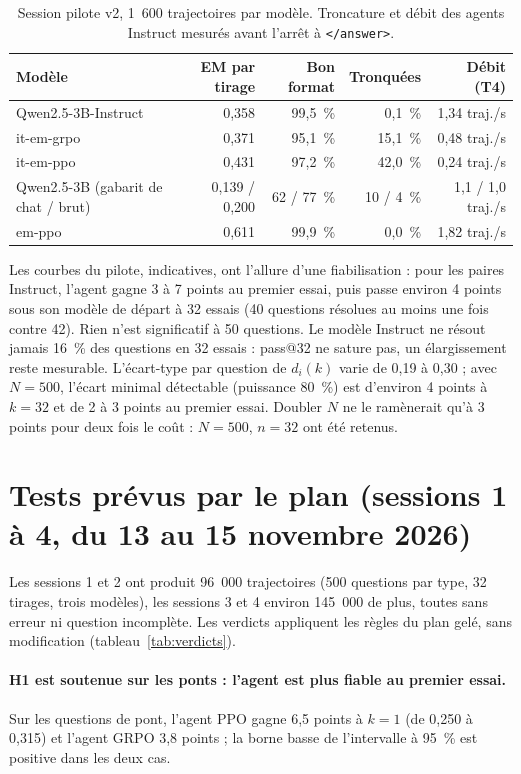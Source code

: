 \begin{table}[h]\centering\small
\begin{tabular}{lrrrr}\toprule
Modèle & EM par tirage & Bon format & Tronquées & Débit (T4)\\\midrule
Qwen2.5-3B-Instruct & 0,358 & 99,5~\% & 0,1~\% & 1,34 traj./s\\
\quad it-em-grpo & 0,371 & 95,1~\% & 15,1~\% & 0,48 traj./s\\
\quad it-em-ppo & 0,431 & 97,2~\% & 42,0~\% & 0,24 traj./s\\
Qwen2.5-3B (gabarit de chat / brut) & 0,139 / 0,200 & 62 / 77~\% & 10 / 4~\% & 1,1 / 1,0 traj./s\\
\quad em-ppo & 0,611 & 99,9~\% & 0,0~\% & 1,82 traj./s\\\bottomrule
\end{tabular}
\caption{Session pilote v2, 1~600 trajectoires par modèle. Troncature et débit des agents Instruct mesurés avant l'arrêt à \texttt{</answer>}.}
\label{tab:pilote}\end{table}

Les courbes du pilote, indicatives, ont l'allure d'une fiabilisation : pour les paires Instruct, l'agent gagne 3 à 7 points au premier essai, puis passe environ 4 points sous son modèle de départ à 32 essais (40 questions résolues au moins une fois contre 42). Rien n'est significatif à 50 questions. Le modèle Instruct ne résout jamais 16~\% des questions en 32 essais : pass@32 ne sature pas, un élargissement reste mesurable. L'écart-type par question de $d_i(k)$ varie de 0,19 à 0,30 ; avec $N = 500$, l'écart minimal détectable (puissance 80~\%) est d'environ 4 points à $k = 32$ et de 2 à 3 points au premier essai. Doubler $N$ ne le ramènerait qu'à 3 points pour deux fois le coût : $N = 500$, $n = 32$ ont été retenus.

\section{Tests prévus par le plan (sessions 1 à 4, du 13 au 15 novembre 2026)}\label{sec:tests-p2}

Les sessions 1 et 2 ont produit 96~000 trajectoires (500 questions par type, 32 tirages, trois modèles), les sessions 3 et 4 environ 145~000 de plus, toutes sans erreur ni question incomplète. Les verdicts appliquent les règles du plan gelé, sans modification (tableau~\ref{tab:verdicts}).

\paragraph{H1 est soutenue sur les ponts : l'agent est plus fiable au premier essai.} Sur les questions de pont, l'agent PPO gagne 6,5 points à $k = 1$ (de 0,250 à 0,315) et l'agent GRPO 3,8 points ; la borne basse de l'intervalle à 95~\% est positive dans les deux cas.

